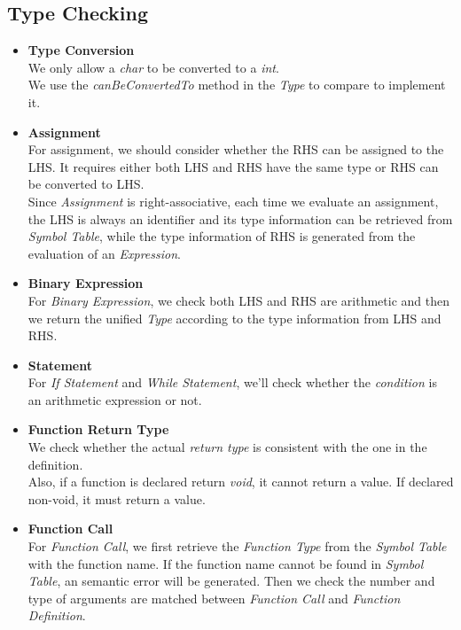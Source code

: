 \documentclass[a4paper,11pt]{article}
\begin{document}
\subsection{Type Checking}
\begin{itemize}
	
	
	\item \textbf{Type Conversion} \\
	We only allow a \textit{char} to be converted to a \textit{int}.\\
	We use the \emph{canBeConvertedTo} method in the \emph{Type} to compare to implement it.
		
	\item \textbf{Assignment} \\
		For assignment, we should consider whether the RHS can be assigned to the LHS. It requires either both LHS and RHS have the same type or RHS can be converted to LHS. \\
		Since \emph{Assignment} is right-associative, each time we evaluate an assignment, the LHS is always an identifier and its type information can be retrieved from \emph{Symbol Table}, while the type information of RHS is generated from the evaluation of an \emph{Expression}.
			
	
	\item \textbf{Binary Expression} \\
	For \emph{Binary Expression}, we check both LHS and RHS are arithmetic and then we return the unified \emph{Type} according to the type information from LHS and RHS.
	
	\item \textbf{Statement} \\
	For \emph{If Statement} and \emph{While Statement}, we'll check whether the \emph{condition} is an arithmetic expression or not.
	
	
	\item \textbf{Function Return Type}\\
	We check whether the actual \emph{return type} is consistent with the one in the definition.\\
	Also, if a function is declared return \emph{void}, it cannot return a value. If declared non-void, it must return a value.
	
	\item \textbf{Function Call} \\
	For \emph{Function Call}, we first retrieve the \emph{Function Type} from the \emph{Symbol Table} with the function name. If the function name cannot be found in \emph{Symbol Table}, an semantic error will be generated. Then we check the number and type of arguments are matched between \emph{Function Call} and \emph{Function Definition}. 
\end{itemize}
\end{document}
